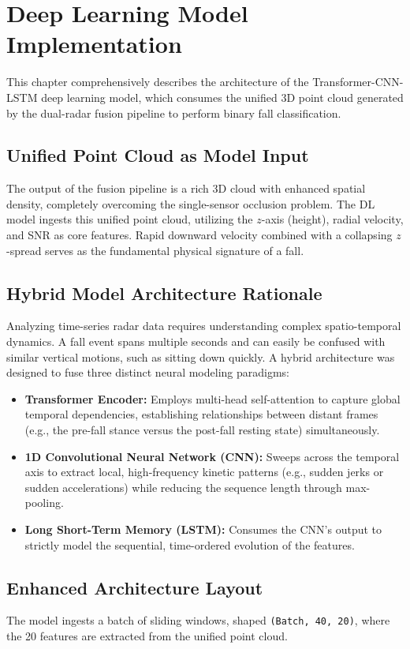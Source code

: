 \chapter{Deep Learning Model Implementation}
This chapter comprehensively describes the architecture of the Transformer-CNN-LSTM deep learning model, which consumes the unified 3D point cloud generated by the dual-radar fusion pipeline to perform binary fall classification.

\section{Unified Point Cloud as Model Input}
The output of the fusion pipeline is a rich 3D cloud with enhanced spatial density, completely overcoming the single-sensor occlusion problem. The DL model ingests this unified point cloud, utilizing the $z$-axis (height), radial velocity, and SNR as core features. Rapid downward velocity combined with a collapsing $z$-spread serves as the fundamental physical signature of a fall.

\section{Hybrid Model Architecture Rationale}
Analyzing time-series radar data requires understanding complex spatio-temporal dynamics. A fall event spans multiple seconds and can easily be confused with similar vertical motions, such as sitting down quickly. A hybrid architecture was designed to fuse three distinct neural modeling paradigms:
\begin{itemize}
\item \textbf{Transformer Encoder:} Employs multi-head self-attention to capture global temporal dependencies, establishing relationships between distant frames (e.g., the pre-fall stance versus the post-fall resting state) simultaneously.
\item \textbf{1D Convolutional Neural Network (CNN):} Sweeps across the temporal axis to extract local, high-frequency kinetic patterns (e.g., sudden jerks or sudden accelerations) while reducing the sequence length through max-pooling.
\item \textbf{Long Short-Term Memory (LSTM):} Consumes the CNN's output to strictly model the sequential, time-ordered evolution of the features.
\end{itemize}

\section{Enhanced Architecture Layout}
The model ingests a batch of sliding windows, shaped \texttt{(Batch, 40, 20)}, where the 20 features are extracted from the unified point cloud. 

